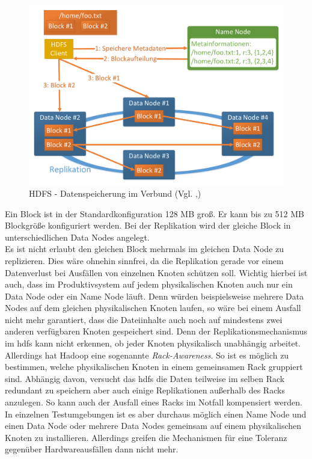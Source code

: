 \begin{figure}[ht]
  \centering
  \includegraphics[width=\textwidth]{./resource/hdfs_cluster_architecture.pdf}
  \caption{HDFS - Datenspeicherung im Verbund (Vgl. \cite{hdfs_architecture},\cite{expert_hadoop_admin})}
  \label{fig:hdfs_cluster_architecture}
\end{figure}

\noindent
Ein Block ist in der Standardkonfiguration 128 MB groß. Er kann bis zu 512 MB Blockgröße konfiguriert werden. Bei der Replikation wird der gleiche Block in unterschiedlichen Data Nodes angelegt.\\
Es ist nicht erlaubt den gleichen Block mehrmals im gleichen Data Node zu replizieren. Dies wäre ohnehin sinnfrei, da die Replikation gerade vor einem Datenverlust bei Ausfällen von einzelnen Knoten schützen soll. Wichtig hierbei ist auch, dass im Produktivsystem auf jedem physikalischen Knoten auch nur ein Data Node oder ein Name Node läuft. Denn würden beispielsweise mehrere Data Nodes auf dem gleichen physikalischen Knoten laufen, so wäre bei einem Ausfall nicht mehr garantiert, dass die Dateiinhalte auch noch auf mindestens zwei anderen verfügbaren Knoten gespeichert sind. Denn der Replikationsmechanismus im \gls{hdfs} kann nicht erkennen, ob jeder Knoten physikalisch unabhängig arbeitet. Allerdings hat Hadoop eine sogenannte \textit{Rack-Awareness}. So ist es möglich zu bestimmen, welche physikalischen Knoten in einem gemeinsamen Rack gruppiert sind. Abhängig davon, versucht das \gls{hdfs} die Daten teilweise im selben Rack redundant zu speichern aber auch einige Replikationen außerhalb des Racks anzulegen. So kann auch der Ausfall eines Racks im Notfall kompensiert werden.\\
In einzelnen Testumgebungen ist es aber durchaus möglich einen Name Node und einen Data Node oder mehrere Data Nodes gemeinsam auf einem physikalischen Knoten zu installieren. Allerdings greifen die Mechanismen für eine Toleranz gegenüber Hardwareausfällen dann nicht mehr.\\

